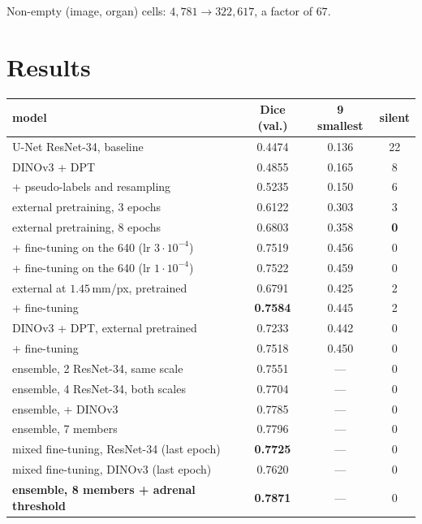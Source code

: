\documentclass{article}
\begin{document}
Non-empty (image, organ) cells: $4{,}781 \to 322{,}617$, a factor of $67$.

\newpage

\section{Results}
\label{sec:results}

\begin{center}
\begin{tabular}{lccc}
\hline
\textbf{model} & \textbf{Dice (val.)} & \textbf{9 smallest} & \textbf{silent} \\
\hline
U-Net ResNet-34, baseline & 0.4474 & 0.136 & 22 \\
DINOv3 + DPT & 0.4855 & 0.165 & 8 \\
+ pseudo-labels and resampling & 0.5235 & 0.150 & 6 \\
\hline
external pretraining, 3 epochs & 0.6122 & 0.303 & 3 \\
external pretraining, 8 epochs & 0.6803 & 0.358 & \textbf{0} \\
\quad + fine-tuning on the 640 (lr $3\cdot10^{-4}$) & 0.7519 & 0.456 & 0 \\
\quad + fine-tuning on the 640 (lr $1\cdot10^{-4}$) & 0.7522 & 0.459 & 0 \\
\hline
external at $1.45$\,mm/px, pretrained & 0.6791 & 0.425 & 2 \\
\quad + fine-tuning & \textbf{0.7584} & 0.445 & 2 \\
DINOv3 + DPT, external pretrained & 0.7233 & 0.442 & 0 \\
\quad + fine-tuning & 0.7518 & 0.450 & 0 \\
\hline
ensemble, 2 ResNet-34, same scale & 0.7551 & --- & 0 \\
ensemble, 4 ResNet-34, both scales & 0.7704 & --- & 0 \\
ensemble, + DINOv3 & 0.7785 & --- & 0 \\
ensemble, 7 members & 0.7796 & --- & 0 \\
\hline
mixed fine-tuning, ResNet-34 (last epoch) & \textbf{0.7725} & --- & 0 \\
mixed fine-tuning, DINOv3 (last epoch) & 0.7620 & --- & 0 \\
\textbf{ensemble, 8 members + adrenal threshold} & \textbf{0.7871} & --- & 0 \\
\hline
\end{tabular}
\end{center}
\end{document}
